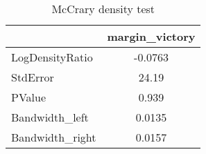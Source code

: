 \begin{table}[htbp]\centering
\caption{McCrary density test\label{tab:McCrary}}
\begin{tabular}{l*{1}{c}}
\hline\hline
            &\multicolumn{1}{c}{margin\_victory}\\
\hline
\hline
LogDensityRatio&     -0.0763\\
StdError    &       24.19\\
PValue      &       0.939\\
Bandwidth\_left&      0.0135\\
Bandwidth\_right&      0.0157\\
\hline\hline
\end{tabular}
\end{table}
